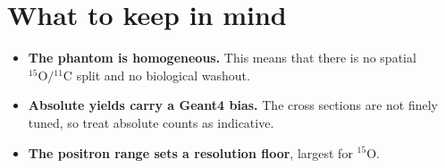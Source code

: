 \documentclass[11pt]{article}
\newcommand{\Cl}[1]{{}^{#1}\mathrm{C}}
\newcommand{\Ox}[1]{{}^{#1}\mathrm{O}}
\begin{document}
\section{What to keep in mind}
\label{sec:caveats}

\begin{itemize}[nosep]
\item \textbf{The phantom is homogeneous.} This means that there is no spatial $\Ox{15}/\Cl{11}$ split and no biological
washout. 
\item \textbf{Absolute yields carry a Geant4 bias.} The cross sections are not finely
tuned, so treat absolute counts as indicative. 
\item \textbf{The positron range sets a resolution floor}, largest for $\Ox{15}$. 
\end{itemize}



\end{document}
